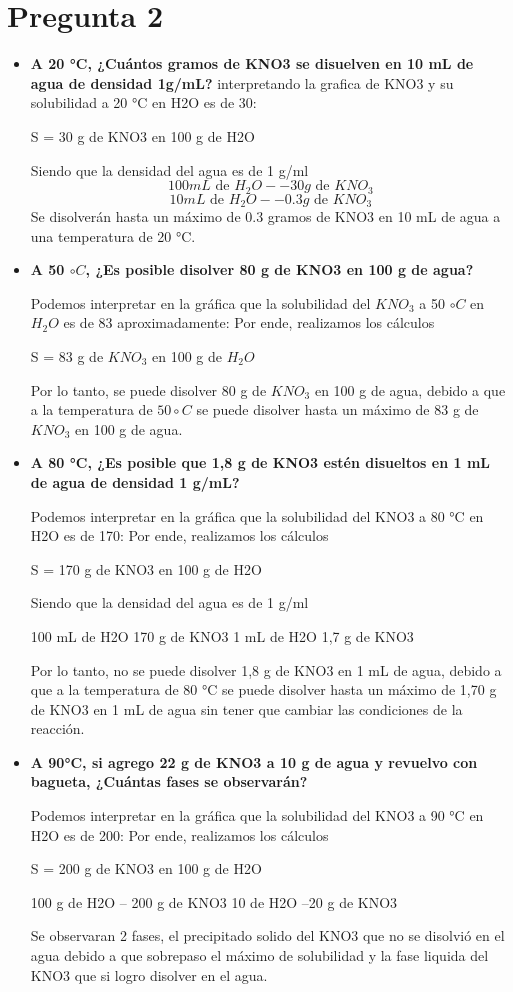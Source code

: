 \documentclass[11pt]{scrartcl}
\begin{document}
    \section{Pregunta 2}
    \begin{itemize}
	    \item \textbf{A 20 °C, ¿Cuántos gramos de KNO3 se disuelven en 10 mL de agua de densidad 1g/mL?} interpretando la grafica de KNO3 y su solubilidad a 20 °C en H2O es de 30:
	     

S = 30 g de KNO3 en 100 g de H2O

Siendo que la densidad del agua es de 1 g/ml 
\[
	100 mL \text{ de } H_{2}O -- 30 g \text{ de } KNO_{3}
\]
\[
	10 mL \text{ de } H_{2}O  --0.3 g \text{ de } KNO_{3}   
\]
Se disolverán hasta un máximo de 0.3 gramos de KNO3 en 10 mL de agua a una temperatura de 20 °C.
\item \textbf{A 50 $\circ C$, ¿Es posible disolver 80 g de KNO3 en 100 g de agua? }

	Podemos interpretar en la gr\'afica que la solubilidad del $KNO_{3}$ a 50 $\circ C$ en $H_{2}O$ es de 83 aproximadamente:
Por ende, realizamos los cálculos

S = 83 g de $KNO_{3}$ en 100 g de $H_{2}O$  
   
Por lo tanto, se puede disolver 80 g de $KNO_{3}$ en 100 g de agua, debido a que a la temperatura de $50 \circ C$ se puede disolver hasta un máximo de 83 g de $KNO_{3}$ en 100 g de agua.
\item \textbf{A 80 °C, ¿Es posible que 1,8 g de KNO3 estén disueltos en 1 mL de agua de densidad 1  g/mL?}

	Podemos interpretar en la gráfica que la solubilidad del KNO3 a 80 °C en H2O es de 170:
Por ende, realizamos los cálculos

S = 170 g de KNO3 en 100 g de H2O  

Siendo que la densidad del agua es de 1 g/ml 

100 mL de H2O  170 g de KNO3
1 mL de H2O  1,7 g de KNO3   

Por lo tanto, no se puede disolver 1,8 g de KNO3 en 1 mL de agua, debido a que a la temperatura de 80 °C se puede disolver hasta un máximo de 1,70 g de KNO3 en 1 mL de agua sin tener que cambiar las condiciones de la reacción. 
\item \textbf{A 90°C, si agrego 22 g de KNO3 a 10 g de agua y revuelvo con bagueta, ¿Cuántas fases se observarán?}

	Podemos interpretar en la gráfica que la solubilidad del KNO3 a 90 °C en H2O es de 200:
Por ende, realizamos los cálculos

S = 200 g de KNO3 en 100 g de H2O   

100 g de H2O -- 200 g de KNO3
10 de H2O  --20 g de KNO3   

Se observaran 2 fases, el precipitado solido del KNO3 que no se disolvió en el agua debido a que sobrepaso el máximo de solubilidad y  la fase liquida del KNO3 que si logro disolver en el agua.
\end{itemize}
\newpage
\end{document}
